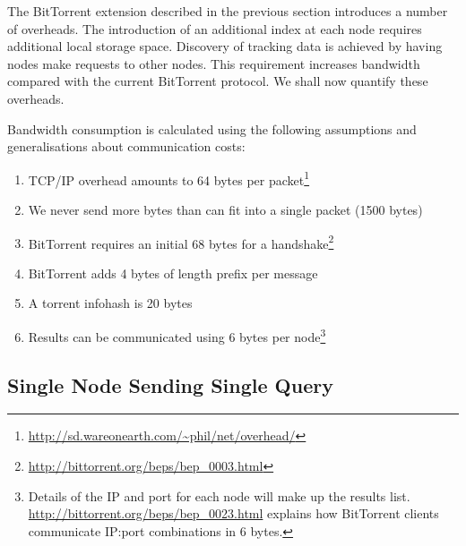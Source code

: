 The BitTorrent extension described in the previous section introduces a number of overheads. The introduction of an additional index at each node requires additional local storage space. Discovery of tracking data is achieved by having nodes make requests to other nodes. This requirement increases bandwidth compared with the current BitTorrent protocol. We shall now quantify these overheads.

Bandwidth consumption is calculated using the following assumptions and generalisations about communication costs: 
\begin{enumerate}
    \item TCP/IP overhead amounts to 64 bytes per packet\footnote{\url{http://sd.wareonearth.com/~phil/net/overhead/}}
    \item We never send more bytes than can fit into a single packet (1500 bytes)
    \item BitTorrent requires an initial 68 bytes for a handshake\footnote{\url{http://bittorrent.org/beps/bep_0003.html}}
    \item BitTorrent adds 4 bytes of length prefix per message
    \item A torrent infohash is 20 bytes
    \item Results can be communicated using 6 bytes per node\footnote{Details of the IP and port for each node will make up the results list. \url{http://bittorrent.org/beps/bep_0023.html} explains how BitTorrent clients communicate IP:port combinations in 6 bytes.}
\end{enumerate}

\subsection{Single Node Sending Single Query}

